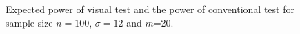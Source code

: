 \documentclass{article}
\begin{document}
\begin{figure}[hbtp]
   \centering
       \caption{Expected power of visual test  and the power of conventional test for sample size $n =100$, $\sigma = 12$ and $m$=20. }
       \label{fig:power_expected}
\end{figure}





%
\end{document}

